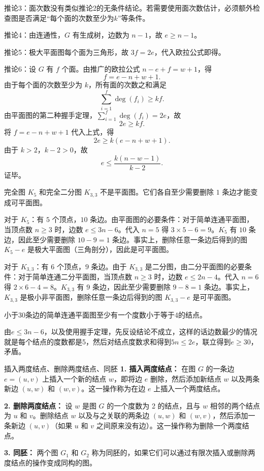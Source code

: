 推论3：面次数没有类似推论2的无条件结论。若需要使用面次数估计，必须额外检查图是否满足“每个面的次数至少为$k$”等条件。

推论4：由连通性，$G$ 有生成树，边数为 $n-1$，故 $e \geqslant n-1$。

推论5：极大平面图每个面为三角形，故 $3f=2e$，代入欧拉公式即得。

推论6：设 $G$ 有 $f$ 个面。由推广的欧拉公式 $n - e + f = w + 1$，得
    \[
    f = e - n + w + 1.
    \]
    由于每个面的次数至少为 $k$，所有面的次数之和满足
    \[
    \sum_{i=1}^{f} \deg(f_i) \ge k f.
    \]
    由平面图的第二种握手定理，$\sum_{i=1}^{f} \deg(f_i) = 2e$，故
    \[
    2e \ge k f.
    \]
    将 $f = e - n + w + 1$ 代入上式，得
    \[
    2e \ge k (e - n + w + 1).
    \]
    由于 $k>2$，$k-2 > 0$，故
    \[
    e \le \frac{k(n - w - 1)}{k-2}.
    \]
    证毕。
\begin{example}{}{}
    完全图 $K_5$ 和完全二分图 $K_{3,3}$ 不是平面图。它们各自至少需要删除 $1$ 条边才能变成可平面图。
\end{example}
对于 $K_5$：有 $5$ 个顶点，$10$ 条边。由平面图的必要条件：对于简单连通平面图，当顶点数 $n \geqslant 3$ 时，边数 $e \leqslant 3n-6$。代入 $n=5$ 得 $3 \times 5 - 6 = 9$。$K_5$ 有 $10$ 条边，因此至少需要删除 $10-9=1$ 条边。事实上，删除任意一条边后得到的图 $K_5 - e$ 是极大平面图（三角剖分），因此是可平面图。

对于 $K_{3,3}$：有 $6$ 个顶点，$9$ 条边。由于 $K_{3,3}$ 是二分图，由二分平面图的必要条件：对于简单连通二分平面图，当顶点数 $n \geqslant 3$ 时，边数 $e \leqslant 2n-4$。代入 $n=6$ 得 $2 \times 6 - 4 = 8$。$K_{3,3}$ 有 $9$ 条边，因此至少需要删除 $9-8=1$ 条边。事实上，$K_{3,3}$ 是极小非平面图，删除任意一条边后得到的图 $K_{3,3} - e$ 是可平面图。

\begin{example}{}{}
    小于30条边的简单连通平面图至少有一个度数小于等于4的结点。
\end{example}
由$e\leqslant 3n-6$，以及使用握手定理，先反设结论不成立，这样的话边数最少的情况就是每个结点的度数都是5，然后对结点度数求和得到$5n\leqslant 2e$，联立得到$e\geqslant 30$，矛盾。

\begin{definition}{插入两度结点、删除两度结点、同胚}{}
\textbf{1. 插入两度结点：}
在图 $G$ 的一条边 $e = (u, v)$ 上插入一个新的结点 $w$，即将边 $e$ 删除，然后添加新结点 $w$ 以及两条新边 $(u, w)$ 和 $(w, v)$。这一操作称为在边 $e$ 上插入一个两度结点。

\textbf{2. 删除两度结点：}
设 $w$ 是图 $G$ 的一个度数为 2 的结点，且与 $w$ 相邻的两个结点为 $u$ 和 $v$。删除结点 $w$ 以及与之关联的两条边 $(u, w)$ 和 $(w, v)$，然后添加一条新边 $(u, v)$（如果 $u$ 和 $v$ 之间原来没有边）。这一操作称为删除一个两度结点。

\textbf{3. 同胚：}
两个图 $G_1$ 和 $G_2$ 称为同胚的，如果它们可以通过有限次插入或删除两度结点的操作变成同构的图。
\end{definition}

